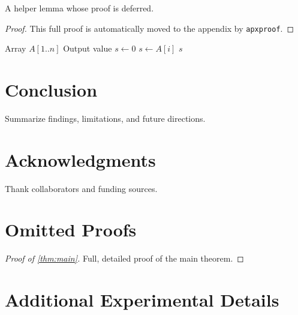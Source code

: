 \documentclass[11pt]{article}
\theoremstyle{definition}
\theoremstyle{remark}
\begin{document}
\begin{lemmarep}\label{lem:helper}
  A helper lemma whose proof is deferred.
\end{lemmarep}
\begin{proof}
  This full proof is automatically moved to the appendix by \texttt{apxproof}.
\end{proof}

\begin{algorithm}[t]
  \caption{Example Algorithm}\label{alg:example}
  \begin{algorithmic}[1]
    \Require Array $A[1..n]$
    \Ensure Output value
    \State $s \gets 0$
    \State $s \gets A[i]$
    \EndIf
    \EndFor
    \State \Return $s$
  \end{algorithmic}
\end{algorithm}

\section{Conclusion}\label{sec:conclusion}
Summarize findings, limitations, and future directions.

\section*{Acknowledgments}
Thank collaborators and funding sources.




\appendix

\section{Omitted Proofs}\label{app:proofs}

\begin{proof}[Proof of \cref{thm:main}]
  Full, detailed proof of the main theorem.
\end{proof}

\section{Additional Experimental Details}\label{app:experiments}
\end{document}
